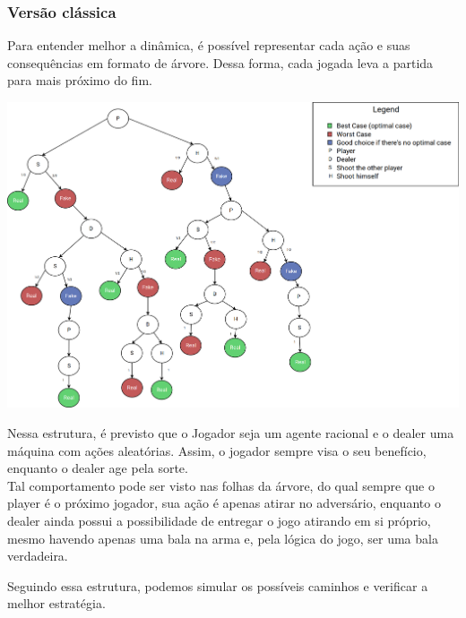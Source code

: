 \documentclass{article}
\begin{document}
\subsubsection{Versão clássica}

Para entender melhor a dinâmica, é possível representar cada ação e suas consequências em formato de árvore. Dessa forma, cada jogada leva a partida para mais próximo do fim.


\begin{center}
	\includegraphics[scale=0.2]{buckshot-roulette-diagram.png}
	\label{fig:classical-model-bckr}
\end{center}

Nessa estrutura, é previsto que o Jogador seja um agente racional e o dealer uma máquina com ações aleatórias. Assim, o jogador sempre visa o seu benefício, enquanto o dealer age pela sorte. \\
Tal comportamento pode ser visto nas folhas da árvore, do qual sempre que o player é o próximo jogador, sua ação é apenas atirar no adversário, enquanto o dealer ainda possui a possibilidade de entregar o jogo atirando em si próprio, mesmo havendo apenas uma bala na arma e, pela lógica do jogo, ser uma bala verdadeira.

Seguindo essa estrutura, podemos simular os possíveis caminhos e verificar a melhor estratégia.
\end{document}
